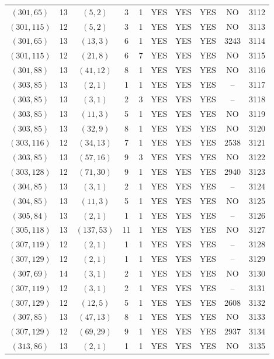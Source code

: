 \begin{longtable}{|c|c|c|c|c|c|c|c|c|c|}
$(301, 65)$ & 13 & $(5, 2)$ & 3 & 1 & YES & YES & YES & NO & 3112\\
$(301, 115)$ & 12 & $(5, 2)$ & 3 & 1 & YES & YES & YES & NO & 3113\\
$(301, 65)$ & 13 & $(13, 3)$ & 6 & 1 & YES & YES & YES & 3243 & 3114\\
$(301, 115)$ & 12 & $(21, 8)$ & 6 & 7 & YES & YES & YES & NO & 3115\\
$(301, 88)$ & 13 & $(41, 12)$ & 8 & 1 & YES & YES & YES & NO & 3116\\
$(303, 85)$ & 13 & $(2, 1)$ & 1 & 1 & YES & YES & YES & -- & 3117\\
$(303, 85)$ & 13 & $(3, 1)$ & 2 & 3 & YES & YES & YES & -- & 3118\\
$(303, 85)$ & 13 & $(11, 3)$ & 5 & 1 & YES & YES & YES & NO & 3119\\
$(303, 85)$ & 13 & $(32, 9)$ & 8 & 1 & YES & YES & YES & NO & 3120\\
$(303, 116)$ & 12 & $(34, 13)$ & 7 & 1 & YES & YES & YES & 2538 & 3121\\
$(303, 85)$ & 13 & $(57, 16)$ & 9 & 3 & YES & YES & YES & NO & 3122\\
$(303, 128)$ & 12 & $(71, 30)$ & 9 & 1 & YES & YES & YES & 2940 & 3123\\
$(304, 85)$ & 13 & $(3, 1)$ & 2 & 1 & YES & YES & YES & -- & 3124\\
$(304, 85)$ & 13 & $(11, 3)$ & 5 & 1 & YES & YES & YES & NO & 3125\\
$(305, 84)$ & 13 & $(2, 1)$ & 1 & 1 & YES & YES & YES & -- & 3126\\
$(305, 118)$ & 13 & $(137, 53)$ & 11 & 1 & YES & YES & YES & NO & 3127\\
$(307, 119)$ & 12 & $(2, 1)$ & 1 & 1 & YES & YES & YES & -- & 3128\\
$(307, 129)$ & 12 & $(2, 1)$ & 1 & 1 & YES & YES & YES & -- & 3129\\
$(307, 69)$ & 14 & $(3, 1)$ & 2 & 1 & YES & YES & YES & NO & 3130\\
$(307, 119)$ & 12 & $(3, 1)$ & 2 & 1 & YES & YES & YES & -- & 3131\\
$(307, 129)$ & 12 & $(12, 5)$ & 5 & 1 & YES & YES & YES & 2608 & 3132\\
$(307, 85)$ & 13 & $(47, 13)$ & 8 & 1 & YES & YES & YES & NO & 3133\\
$(307, 129)$ & 12 & $(69, 29)$ & 9 & 1 & YES & YES & YES & 2937 & 3134\\
$(313, 86)$ & 13 & $(2, 1)$ & 1 & 1 & YES & YES & YES & NO & 3135\\

\end{longtable}
